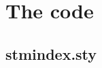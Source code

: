 \documentclass[%
  type=article,%
  layout=koma,%
  date=true,%
  hyperref=true,%
  index=false,%
  listings=true%
]{stmtext}
\begin{document}




\printstmindex


\newpage
\appendix

\section{The code}

\subsection{stmindex.sty}




% 


% 
\end{document}
